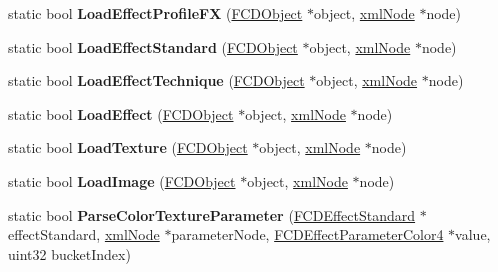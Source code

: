 \begin{DoxyCompactItemize}
\item 
\hypertarget{classFArchiveXML_a321afcd5fb3bf1bd8f0a6068ea95f230}{
static bool {\bfseries LoadEffectProfileFX} (\hyperlink{classFCDObject}{FCDObject} $\ast$object, \hyperlink{struct__xmlNode}{xmlNode} $\ast$node)}
\label{classFArchiveXML_a321afcd5fb3bf1bd8f0a6068ea95f230}

\item 
\hypertarget{classFArchiveXML_a5bf4e7feb6cf2e1d8cecc47a2d5c5d5a}{
static bool {\bfseries LoadEffectStandard} (\hyperlink{classFCDObject}{FCDObject} $\ast$object, \hyperlink{struct__xmlNode}{xmlNode} $\ast$node)}
\label{classFArchiveXML_a5bf4e7feb6cf2e1d8cecc47a2d5c5d5a}

\item 
\hypertarget{classFArchiveXML_ab02955007a3e0a50373cd03e44ad1eb2}{
static bool {\bfseries LoadEffectTechnique} (\hyperlink{classFCDObject}{FCDObject} $\ast$object, \hyperlink{struct__xmlNode}{xmlNode} $\ast$node)}
\label{classFArchiveXML_ab02955007a3e0a50373cd03e44ad1eb2}

\item 
\hypertarget{classFArchiveXML_a3a1872c89840e3b0af2f45fc1375e672}{
static bool {\bfseries LoadEffect} (\hyperlink{classFCDObject}{FCDObject} $\ast$object, \hyperlink{struct__xmlNode}{xmlNode} $\ast$node)}
\label{classFArchiveXML_a3a1872c89840e3b0af2f45fc1375e672}

\item 
\hypertarget{classFArchiveXML_a3292f8a8a3dca9046bec1a417cd13d14}{
static bool {\bfseries LoadTexture} (\hyperlink{classFCDObject}{FCDObject} $\ast$object, \hyperlink{struct__xmlNode}{xmlNode} $\ast$node)}
\label{classFArchiveXML_a3292f8a8a3dca9046bec1a417cd13d14}

\item 
\hypertarget{classFArchiveXML_ac40abf7d8f99b67eafea35aef962870c}{
static bool {\bfseries LoadImage} (\hyperlink{classFCDObject}{FCDObject} $\ast$object, \hyperlink{struct__xmlNode}{xmlNode} $\ast$node)}
\label{classFArchiveXML_ac40abf7d8f99b67eafea35aef962870c}

\item 
\hypertarget{classFArchiveXML_ac4e5157296983ebccf95db178d1ce8c0}{
static bool {\bfseries ParseColorTextureParameter} (\hyperlink{classFCDEffectStandard}{FCDEffectStandard} $\ast$effectStandard, \hyperlink{struct__xmlNode}{xmlNode} $\ast$parameterNode, \hyperlink{classFCDEffectParameterAnimatableT}{FCDEffectParameterColor4} $\ast$value, uint32 bucketIndex)}
\label{classFArchiveXML_ac4e5157296983ebccf95db178d1ce8c0}


\end{DoxyCompactItemize}
